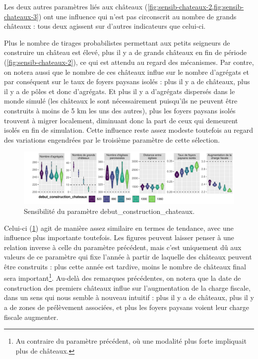 Les deux autres paramètres liés aux châteaux (\cref{fig:sensib-chateaux-2,fig:sensib-chateaux-3}) ont une influence qui n'est pas circonscrit au nombre de grands châteaux : tous deux agissent sur d'autres indicateurs que celui-ci.

Plus le nombre de tirages probabilistes permettant aux petits seigneurs de construire un château est élevé, plus il y a de grands châteaux en fin de période (\cref{fig:sensib-chateaux-2}), ce qui est attendu au regard des mécanismes.
Par contre, on notera aussi que le nombre de ces châteaux influe sur le nombre d'agrégats et par conséquent sur le taux de foyers paysans isolés :
plus il y a de châteaux, plus il y a de pôles et donc d'agrégats.
Et plus il y a d'agrégats dispersés dans le monde simulé (les châteaux le sont nécessairement puisqu'ils ne peuvent être construits à moins de 5 km les uns des autres), plus les foyers paysans isolés trouvent à migrer localement, diminuant donc la part de ceux qui demeurent isolés en fin de simulation.
Cette influence reste assez modeste toutefois au regard des variations engendrées par le troisième paramètre de cette sélection.

\begin{figure}[H]
	\centering
	\includegraphics[width=\linewidth]{img/sensib/sensibilite_debut_construction_chateaux.pdf}
	\caption{Sensibilité du paramètre \textsf{debut\_construction\_chateaux}.}
	\label{fig:sensib-chateaux-3}
\end{figure}

Celui-ci (\cref{fig:sensib-chateaux-3}) agit de manière assez similaire en termes de tendance, avec une influence plus importante toutefois.
Les figures peuvent laisser penser à une relation inverse à celle du paramètre précédent, mais c'est uniquement dû aux valeurs de ce paramètre qui fixe l'année à partir de laquelle des châteaux peuvent être construits : plus cette année est tardive, moins le nombre de châteaux final sera important\footnote{
	Au contraire du paramètre précédent, où une modalité plus forte impliquait plus de châteaux.
}.
Au-delà des remarques précédentes, on notera que la date de construction des premiers châteaux influe sur l'augmentation de la charge fiscale, dans un sens qui nous semble à nouveau intuitif : plus il y a de châteaux, plus il y a de zones de prélèvement associées, et plus les foyers paysans voient leur charge fiscale augmenter.

